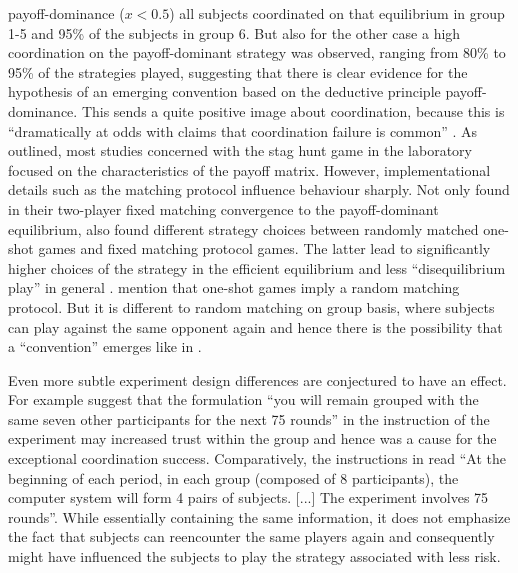 \documentclass[11pt]{article}
\begin{document}
payoff-dominance ($x < 0.5$) all subjects coordinated on that equilibrium in 
group 1-5 and 95\% of the subjects in group 6. But also for the other case a 
high coordination on the payoff-dominant strategy was observed, ranging from 
80\% to 95\% of the strategies played, suggesting that there is clear evidence
for the hypothesis of an emerging convention based on the deductive principle
payoff-dominance. This sends a quite positive image about coordination, because 
this is ``dramatically at odds with claims that coordination failure is common''
\parencite[9]{devetag_when_2007}. 
As outlined, most studies concerned with the stag hunt game in the 
laboratory focused on the characteristics of the payoff matrix. 
However, implementational details 
such as the matching protocol influence behaviour sharply. Not only 
\textcite{van_huyck_tacit_1990} found in their two-player fixed matching
convergence to the payoff-dominant equilibrium, 
\textcite{clark_repetition_2001} also found different strategy 
choices between randomly matched one-shot games and fixed matching protocol 
games. The latter lead to significantly higher choices of the strategy 
in the efficient equilibrium and less ``disequilibrium play'' in general
\parencite[]{clark_repetition_2001}. 
\textcite{devetag_when_2007} mention that one-shot games imply a 
random matching protocol. But it is different to random matching on group
basis, where subjects can play against the same opponent again 
and hence there is the possibility that a ``convention'' emerges like in 
\textcite{rankin_strategic_2000}.

Even more subtle experiment design differences are conjectured to have an
effect. For example \textcite{devetag_when_2007} suggest that the formulation
``you will remain grouped with the same seven other participants for the next
75 rounds'' in the instruction of the \textcite{rankin_strategic_2000}  
experiment may increased trust within the group and hence was a 
cause for the exceptional coordination success. Comparatively, the 
instructions in \textcite{dubois_optimization_2012} read ``At the beginning
of each period, in each group (composed of 8 participants), the computer
system will form 4 pairs of subjects. [...] The experiment 
involves 75 rounds''\parencite[378]{dubois_optimization_2012}. 
While essentially containing the same information,
it does not emphasize the fact that subjects can reencounter the same 
players again and consequently might have influenced the subjects to play
the strategy associated with less risk.
\end{document}
